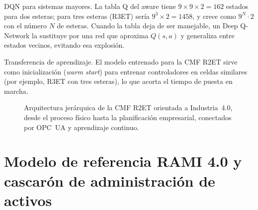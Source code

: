 DQN para sistemas mayores. La tabla Q del aware tiene $9\times9\times2=162$ estados para dos esteras; para tres esteras (R3ET) sería $9^3\times2=1458$, y crece como $9^N\cdot2$ con el número $N$ de esteras. Cuando la tabla deja de ser manejable, un Deep Q-Network la sustituye por una red que aproxima $Q(s,a)$ y generaliza entre estados vecinos, evitando esa explosión.

Transferencia de aprendizaje. El modelo entrenado para la CMF R2ET sirve como inicialización (\emph{warm start}) para entrenar controladores en celdas similares (por ejemplo, R3ET con tres esteras), lo que acorta el tiempo de puesta en marcha.

\begin{figure}[H]
\centering
{}
\caption{Arquitectura jerárquica de la CMF R2ET orientada a Industria~4.0, desde el proceso físico hasta la planificación empresarial, conectados por OPC~UA y aprendizaje continuo.}
\label{fig:i40_arch}
\end{figure}

\section{Modelo de referencia RAMI 4.0 y cascarón de administración de activos}

